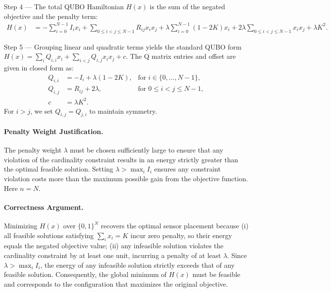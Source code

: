 \documentclass[12pt]{article}
\begin{document}
Step 4 --- The total QUBO Hamiltonian $H(x)$ is the sum of the negated objective and the penalty term:
\begin{align}
  H(x) &= -\sum_{i=0}^{N-1} I_i x_i + \sum_{0 \le i < j \le N-1} R_{ij} x_i x_j + \lambda \sum_{i=0}^{N-1} (1 - 2K) x_i + 2\lambda \sum_{0 \le i < j \le N-1} x_i x_j + \lambda K^2.
\end{align}

Step 5 --- Grouping linear and quadratic terms yields the standard QUBO form $H(x) = \sum_{i} Q_{i,i} x_i + \sum_{i < j} Q_{i,j} x_i x_j + c$. The Q matrix entries and offset are given in closed form as:
\begin{align}
  Q_{i,i} &= -I_i + \lambda(1 - 2K), & \text{for } i \in \{0, \dots, N-1\}, \\
  Q_{i,j} &= R_{ij} + 2\lambda, & \text{for } 0 \le i < j \le N-1, \\
  c &= \lambda K^2.
\end{align}
For $i > j$, we set $Q_{i,j} = Q_{j,i}$ to maintain symmetry.

\paragraph{Penalty Weight Justification.}
The penalty weight $\lambda$ must be chosen sufficiently large to ensure that any violation of the cardinality constraint results in an energy strictly greater than the optimal feasible solution. Setting $\lambda > \max_i I_i$ ensures any constraint violation costs more than the maximum possible gain from the objective function. Here $n = N$.

\paragraph{Correctness Argument.}
Minimizing $H(x)$ over $\{0,1\}^N$ recovers the optimal sensor placement because (i) all feasible solutions satisfying $\sum_i x_i = K$ incur zero penalty, so their energy equals the negated objective value; (ii) any infeasible solution violates the cardinality constraint by at least one unit, incurring a penalty of at least $\lambda$. Since $\lambda > \max_i I_i$, the energy of any infeasible solution strictly exceeds that of any feasible solution. Consequently, the global minimum of $H(x)$ must be feasible and corresponds to the configuration that maximizes the original objective.
\end{document}
